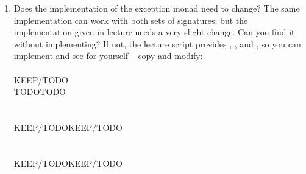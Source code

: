 \documentclass{article}
\begin{document}
\begin{exercise}
\begin{enumerate}
    \item Does the implementation of the exception monad need to change? The
    same implementation can work with both sets of signatures, but the
    implementation given in lecture needs a very slight change. Can you find
    it without implementing? If not, the lecture script provides
    {}, {}, {} and
    {}, so you can implement and see for yourself -- copy
    {} and modify:\\
    {}{}{\hlopt{:
    }}{}{\hlendline{}}\\
    {\hlstd{ \ }}{}{\hlopt{(}}{}{\hlopt{,
    }}{}{\hlopt{) }}{}{\hlopt{=
    }}KEEP/TODO{\hlstd{{\hlendline{}}\\
    \ }}{}{}{\hlendline{}}\\
    {\hlstd{ \ }}{}{}{\hlopt{:
    (}}{}{\hlopt{, }}{}{\hlopt{) }}{}{\hlopt{-> (}}{}{\hlopt{, }}{}{\hlopt{)
    }}{}{}{}{\hlopt{:
    }}TODO{\hlstd{{\hlendline{}}\\
    \ }}{}{}{\hlopt{: }}TODO{\hlendline{}}\\
    {}{\hlopt{= }}{}{\hlendline{}}\\
    {\hlstd{ \ }}{}{}{\hlopt{=
    }}{}{\hlendline{}}\\
    {\hlstd{ \ \ \ }}{}{\hlopt{(}}{}{\hlopt{,
    }}{}{\hlopt{) }}{}{\hlopt{=
    }}KEEP/TODO{\hlstd{{\hlendline{}}\\
    \ \ \ }}{}{}{\hlopt{= }}{}{}{}{}{\hlopt{=
    }}KEEP/TODO{\hlstd{{\hlendline{}}\\
    \ }}{}{\hlendline{}}\\
    {\hlstd{ \ }}{}{}{\hlendline{}}\\
    {\hlstd{ \ }}{}{}{\hlopt{(}}{}{\hlopt{)}}{\hlendline{}}\\
    {\hlstd{ \ }}{}{}{\hlopt{=
    }}KEEP/TODO{\hlstd{{\hlendline{}}\\
    \ }}{}{}{\hlopt{=
    }}KEEP/TODO{\hlendline{}}\\
    {}{\hlstd{ \ \ \ }}{\hlendline{}}
  \end{enumerate}
\end{exercise}
\end{document}
